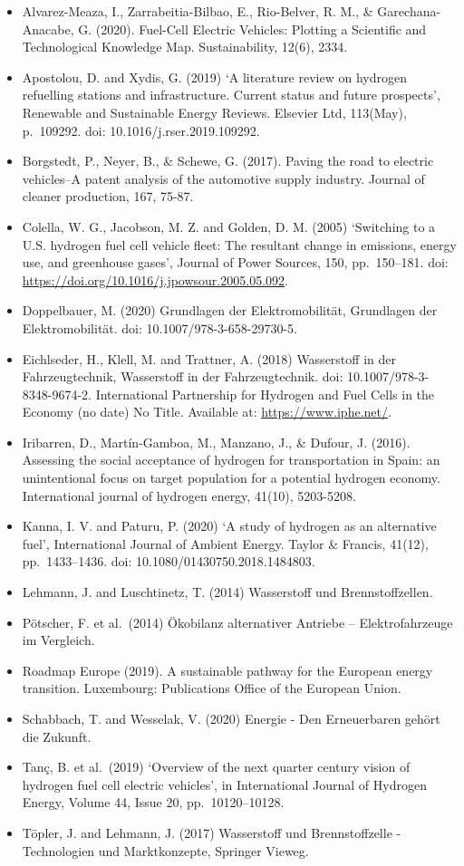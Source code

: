 \documentclass[
]{book}
\providecommand{\tightlist}{%
  \setlength{\itemsep}{0pt}\setlength{\parskip}{0pt}}
\begin{document}
\begin{itemize}
\tightlist
\item
  Alvarez-Meaza, I., Zarrabeitia-Bilbao, E., Rio-Belver, R. M., \& Garechana-Anacabe, G. (2020). Fuel-Cell Electric Vehicles: Plotting a Scientific and Technological Knowledge Map. Sustainability, 12(6), 2334.
\item
  Apostolou, D. and Xydis, G. (2019) `A literature review on hydrogen refuelling stations and infrastructure. Current status and future prospects', Renewable and Sustainable Energy Reviews. Elsevier Ltd, 113(May), p.~109292. doi: 10.1016/j.rser.2019.109292.
\item
  Borgstedt, P., Neyer, B., \& Schewe, G. (2017). Paving the road to electric vehicles--A patent analysis of the automotive supply industry. Journal of cleaner production, 167, 75-87.
\item
  Colella, W. G., Jacobson, M. Z. and Golden, D. M. (2005) `Switching to a U.S. hydrogen fuel cell vehicle fleet: The resultant change in emissions, energy use, and greenhouse gases', Journal of Power Sources, 150, pp.~150--181. doi: \url{https://doi.org/10.1016/j.jpowsour.2005.05.092}.
\item
  Doppelbauer, M. (2020) Grundlagen der Elektromobilität, Grundlagen der Elektromobilität. doi: 10.1007/978-3-658-29730-5.
\item
  Eichlseder, H., Klell, M. and Trattner, A. (2018) Wasserstoff in der Fahrzeugtechnik, Wasserstoff in der Fahrzeugtechnik. doi: 10.1007/978-3-8348-9674-2.
  International Partnership for Hydrogen and Fuel Cells in the Economy (no date) No Title. Available at: \url{https://www.iphe.net/}.
\item
  Iribarren, D., Martín-Gamboa, M., Manzano, J., \& Dufour, J. (2016). Assessing the social acceptance of hydrogen for transportation in Spain: an unintentional focus on target population for a potential hydrogen economy. International journal of hydrogen energy, 41(10), 5203-5208.
\item
  Kanna, I. V. and Paturu, P. (2020) `A study of hydrogen as an alternative fuel', International Journal of Ambient Energy. Taylor \& Francis, 41(12), pp.~1433--1436. doi: 10.1080/01430750.2018.1484803.
\item
  Lehmann, J. and Luschtinetz, T. (2014) Wasserstoff und Brennstoffzellen.
\item
  Pötscher, F. et al.~(2014) Ökobilanz alternativer Antriebe -- Elektrofahrzeuge im Vergleich.
\item
  Roadmap Europe (2019). A sustainable pathway for the European energy transition. Luxembourg: Publications Office of the European Union.
\item
  Schabbach, T. and Wesselak, V. (2020) Energie - Den Erneuerbaren gehört die Zukunft.
\item
  Tanç, B. et al.~(2019) `Overview of the next quarter century vision of hydrogen fuel cell electric vehicles', in International Journal of Hydrogen Energy, Volume 44, Issue 20, pp.~10120--10128.
\item
  Töpler, J. and Lehmann, J. (2017) Wasserstoff und Brennstoffzelle - Technologien und Marktkonzepte, Springer Vieweg.
\end{itemize}
\end{document}
